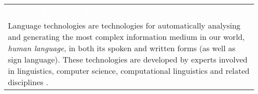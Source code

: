 {\begin{tabular}{p{.93\linewidth}}
  \rowcolor{orange2}\vspace{.10cm}\centerline{{\textcolor{white}{\Large\textbf{What is Language Technology?}}}}\\[-2mm]
  \rowcolor{orange2} Language technologies are technologies for automatically analysing and generating the most complex information medium in our world, \emph{human language}, in both its spoken and written forms (as well as sign language). These technologies are developed by experts involved in linguistics, computer science, computational linguistics and related disciplines \cite{jurafsky-martin01,manning-schuetze1,lt-world1,lt-survey1}.
  \vspace*{3mm} \\
  \end{tabular}
  \normalfont
}
